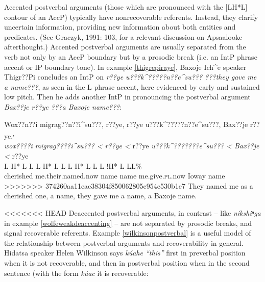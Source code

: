 \documentclass[output=paper]{LSP/langsci}
\begin{document}
Accented postverbal arguments (those which are pronounced with the [LH*L] contour of an AccP) typically have nonrecoverable referents. Instead, they clarify uncertain information, providing new information about both entities and predicates. (See Graczyk, 1991: 103, for a relevant discussion on Apsaalooke afterthought.) Accented postverbal arguments are usually separated from the verb not only by an AccP boundary but by a prosodic break (i.e. an IntP phrase accent or IP boundary tone). In example \ref{thigrepiraye}, Baxoje Ich\^{}e speaker Thigr??Pi concludes an IntP on \emph{r??ye u???k\^{}?????n??e\^{}su??? ???they gave me a name???}, as seen in the L phrase accent, here evidenced by early and sustained low pitch. Then he adds another IntP in pronouncing the postverbal argument \emph{Bax??je r??ye ???a Baxoje name???}:

\ea\label{thigrepiraye}
Wox??n??i migrag??n??i\^{}su???, r??ye, r??ye u???k\^{}?????n??e\^{}su???, Bax??je r??ye.\footnotemark\textsuperscript{,} \footnotemark\\
\glll	\emph{wox????i} 	\emph{migrag????i\^{}su??? <}		\emph{r??ye <}	r??ye		\emph{u???k\^{}???????e\^{}su??? <}	\emph{Bax??je <}		r??ye\\
	{\ob L H* L}		{L\cb}	{\ob L H* L L\cb}	{\ob L H* L}	{L\cb}	{\ob L !H* L} 		{L\cb{}L\%}\\
	cherished	me.their.named.now	name		name	me.give.\textsc{pl}.now	Ioway			name\\
>>>>>>> 374260aa11eac38304f850062805c954c530b1e7
\glt	They named me as a cherished one, a name, they gave me a name, a Baxoje name.
\z

<<<<<<< HEAD
Deaccented postverbal arguments, in contrast -- like \emph{níkshiⁿga} in example \ref{wolfeweakdeaccenting} -- are not separated by prosodic breaks, and signal recoverable referents. Example \ref{wilkinsonpostverbal} is a useful model of the relationship between postverbal arguments and recoverability in general. Hidatsa speaker Helen Wilkinson says \emph{kúahe “this”} first in preverbal position when it is not recoverable, and then in postverbal position when in the second sentence (with the form \emph{kúac} it is recoverable:
\end{document}
